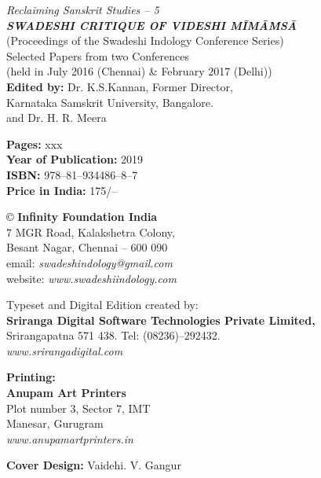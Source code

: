 \thispagestyle{empty}

 \textit{Reclaiming Sanskrit Studies – 5}\\\textbf{\textit{SWADESHI CRITIQUE OF VIDESHI MĪMĀṀSĀ}}\\
 (Proceedings of the Swadeshi Indology Conference Series)\\
 Selected Papers from two Conferences\\
 (held in July 2016 (Chennai) \& February 2017 (Delhi))\\\textbf{Edited by:} Dr. K.S.Kannan, Former Director,\\
 Karnataka Samskrit University, Bangalore.\\
 and Dr. H. R. Meera

 \textbf{Pages:} xxx\\\textbf{Year of Publication:} 2019\\\textbf{ISBN:} 978–81–934486–8–7\\\textbf{Price in India:} 175/–

 © \textbf{Infinity Foundation India}\\
 7 MGR Road, Kalakshetra Colony,\\
 Besant Nagar, Chennai – 600 090\\
 email: \textit{swadeshindology@gmail.com}\\
 website: \textit{www.swadeshiindology.com}

 Typeset and Digital Edition created by:\\\textbf{Sriranga Digital Software Technologies Private Limited,}\\
 Srirangapatna 571 438. Tel: (08236)–292432.\\\textit{www.srirangadigital.com}

 \textbf{Printing:}\\\textbf{Anupam Art Printers}\\
 Plot number 3, Sector 7, IMT\\
 Manesar, Gurugram\\\textit{www.anupamartprinters.in}

\textbf{Cover Design:} Vaidehi. V. Gangur

